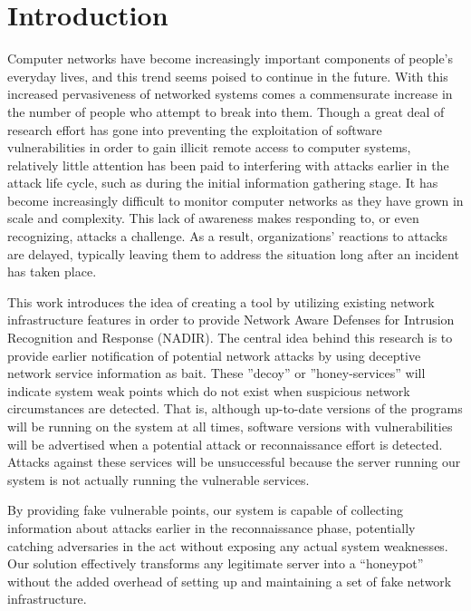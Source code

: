 \section{Introduction}
\label{introduction}


Computer networks have become increasingly important components of people's everyday lives, and this trend seems poised to continue in the future. With this increased pervasiveness of networked systems
comes a commensurate increase in the number of people who attempt to break into them. Though a great deal of research effort has gone into preventing the exploitation of software vulnerabilities in order to
gain illicit remote access to computer systems, relatively little attention has been paid to interfering with attacks earlier in the attack life cycle, such as during the initial information gathering
stage. It has become increasingly difficult to monitor computer networks as they have grown in scale and complexity. This lack of awareness makes responding to, or even recognizing, attacks a challenge. As
a result, organizations' reactions to attacks are delayed, typically leaving them to address the situation long after an incident has taken place.

This work introduces the idea of creating a tool by utilizing existing network infrastructure features in order to provide Network Aware Defenses for Intrusion Recognition and Response (NADIR). The central
idea behind this research is to provide earlier notification of potential network attacks by using deceptive network service information  as bait. These ''decoy'' or ''honey-services'' will indicate system
weak points which do not exist when suspicious network circumstances are detected. That is, although up-to-date versions of the programs will be running on the system at all times, software versions with
vulnerabilities will be advertised when a potential attack or reconnaissance effort is detected. Attacks against these services will be unsuccessful because the server running our system is not actually
running the vulnerable services.

By providing fake vulnerable points, our system is capable of collecting information about attacks earlier in the reconnaissance phase, potentially catching adversaries in the act without exposing any
actual system weaknesses. Our solution effectively transforms any legitimate server into a ``honeypot'' without the added overhead of setting up and maintaining a set of fake network infrastructure.

